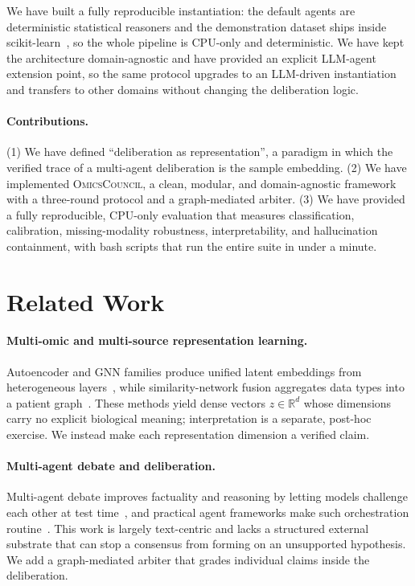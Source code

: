 \documentclass[runningheads]{llncs}
\begin{document}
We have built a fully reproducible instantiation: the default agents are deterministic statistical reasoners and the demonstration dataset ships inside scikit-learn~\cite{pedregosa2011scikit}, so the whole pipeline is CPU-only and deterministic. We have kept the architecture domain-agnostic and have provided an explicit LLM-agent extension point, so the same protocol upgrades to an LLM-driven instantiation and transfers to other domains without changing the deliberation logic.

\paragraph{Contributions.}
(1) We have defined ``deliberation as representation'', a paradigm in which the verified trace of a multi-agent deliberation is the sample embedding. (2) We have implemented \textsc{OmicsCouncil}, a clean, modular, and domain-agnostic framework with a three-round protocol and a graph-mediated arbiter. (3) We have provided a fully reproducible, CPU-only evaluation that measures classification, calibration, missing-modality robustness, interpretability, and hallucination containment, with bash scripts that run the entire suite in under a minute.

\section{Related Work}
\paragraph{Multi-omic and multi-source representation learning.}
Autoencoder and GNN families produce unified latent embeddings from heterogeneous layers~\cite{benkirane2023customics,wang2021mogonet}, while similarity-network fusion aggregates data types into a patient graph~\cite{wang2014snf}. These methods yield dense vectors $z\in\mathbb{R}^d$ whose dimensions carry no explicit biological meaning; interpretation is a separate, post-hoc exercise. We instead make each representation dimension a verified claim.

\paragraph{Multi-agent debate and deliberation.}
Multi-agent debate improves factuality and reasoning by letting models challenge each other at test time~\cite{du2024debate,liang2024divergent}, and practical agent frameworks make such orchestration routine~\cite{wu2023autogen}. This work is largely text-centric and lacks a structured external substrate that can stop a consensus from forming on an unsupported hypothesis. We add a graph-mediated arbiter that grades individual claims inside the deliberation.
\end{document}
